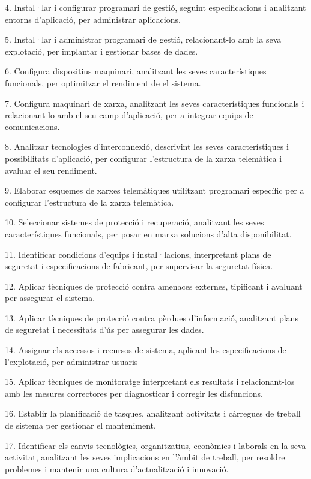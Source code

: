 \documentclass[catalan, a4paper, 12pt, titlepage]{article}
\begin{document}
4. Instal·lar i configurar programari de gestió, seguint especificacions i analitzant entorns d'aplicació, per administrar aplicacions.

5. Instal·lar i administrar programari de gestió, relacionant-lo amb la seva explotació, per implantar i gestionar bases de dades.

6. Configura dispositius maquinari, analitzant les seves característiques funcionals, per optimitzar el rendiment de el sistema.

7. Configura maquinari de xarxa, analitzant les seves característiques funcionals i relacionant-lo amb el seu camp d'aplicació, per a integrar equips de comunicacions.

8. Analitzar tecnologies d'interconnexió, descrivint les seves característiques i possibilitats d'aplicació, per configurar l'estructura de la xarxa telemàtica i avaluar el seu rendiment.

9. Elaborar esquemes de xarxes telemàtiques utilitzant programari específic per a configurar l'estructura de la xarxa telemàtica.

10. Seleccionar sistemes de protecció i recuperació, analitzant les seves característiques funcionals, per posar en marxa solucions d'alta disponibilitat.

11. Identificar condicions d'equips i instal·lacions, interpretant plans de seguretat i especificacions de fabricant, per supervisar la seguretat física.

12. Aplicar tècniques de protecció contra amenaces externes, tipificant i avaluant per assegurar el sistema.

13. Aplicar tècniques de protecció contra pèrdues d'informació, analitzant plans de seguretat i necessitats d'ús per assegurar les dades.

14. Assignar els accessos i recursos de sistema, aplicant les especificacions de l'explotació, per administrar usuaris

15. Aplicar tècniques de monitoratge interpretant els resultats i relacionant-los amb les mesures correctores per diagnosticar i corregir les disfuncions.

16. Establir la planificació de tasques, analitzant activitats i càrregues de treball de sistema per gestionar el manteniment.

17. Identificar els canvis tecnològics, organitzatius, econòmics i laborals en la seva activitat, analitzant les seves implicacions en l'àmbit de treball, per resoldre problemes i mantenir una cultura d'actualització i innovació.
\end{document}
